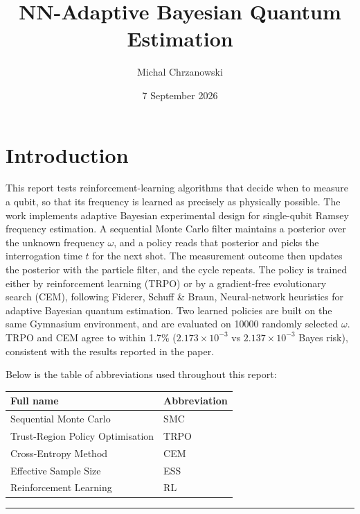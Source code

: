 \documentclass[12pt,a4paper]{article}
\title{NN-Adaptive Bayesian Quantum Estimation}
\author{Michal Chrzanowski}
\date{7 September 2026}
\begin{document}
\maketitle

\section*{Introduction}
This report tests reinforcement-learning algorithms that decide when to measure a qubit, so that its
frequency is learned as precisely as physically possible. The work implements adaptive Bayesian
experimental design for single-qubit Ramsey frequency estimation. A sequential Monte Carlo filter
maintains a posterior over the unknown frequency $\omega$, and a policy reads that posterior
and picks the interrogation time $t$ for the next shot. The measurement outcome then updates the posterior with the particle filter, and the cycle repeats. The policy is trained either by reinforcement learning (TRPO) or
by a gradient-free evolutionary search (CEM), following Fiderer, Schuff \& Braun,
Neural-network heuristics for adaptive Bayesian quantum estimation.
Two learned policies are built on the same Gymnasium environment, and are
evaluated on \num{10000} randomly selected $\omega$.
TRPO and CEM agree to within 1.7\% ($2.173\times10^{-3}$ vs $2.137\times10^{-3}$ Bayes risk),
consistent with the results reported in the paper.

Below is the table of abbreviations used throughout this report:
\begin{table}[H]
  \centering
  \begin{tabular}{@{}>{\raggedright\arraybackslash}p{}
                    >{\raggedright\arraybackslash}p{}@{}}
    \toprule
    Full name & Abbreviation \\
    \midrule
    Sequential Monte Carlo & SMC \\
    Trust-Region Policy Optimisation & TRPO \\
    Cross-Entropy Method & CEM \\
    Effective Sample Size & ESS \\
    Reinforcement Learning & RL \\
    \bottomrule
  \end{tabular}
\end{table}

\noindent\rule{\textwidth}{0.4pt}
\FloatBarrier
\end{document}
